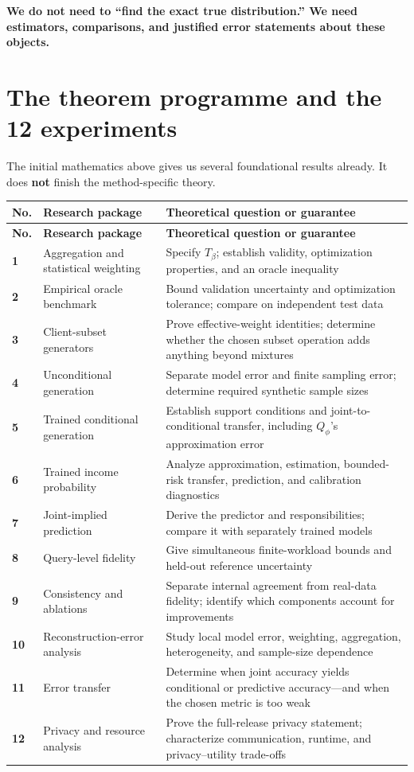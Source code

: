 \documentclass[11pt,a4paper]{article}
\begin{document}
\normalsize
\textbf{We do not need to ``find the exact true distribution.'' We need estimators, comparisons, and justified error statements about these objects.}

\section{The theorem programme and the 12 experiments}
The initial mathematics above gives us several foundational results already. It does \textbf{not} finish the method-specific theory.

\small
\begin{longtable}{@{}P{0.05\textwidth}P{0.29\textwidth}P{0.60\textwidth}@{}}
\toprule
\textbf{No.}&\textbf{Research package}&\textbf{Theoretical question or guarantee}\\\midrule
\endfirsthead
\toprule
\textbf{No.}&\textbf{Research package}&\textbf{Theoretical question or guarantee}\\\midrule
\endhead
\bottomrule\endfoot
\textbf{1}&Aggregation and statistical weighting&Specify $T_\beta$; establish validity, optimization properties, and an oracle inequality\\
\textbf{2}&Empirical oracle benchmark&Bound validation uncertainty and optimization tolerance; compare on independent test data\\
\textbf{3}&Client-subset generators&Prove effective-weight identities; determine whether the chosen subset operation adds anything beyond mixtures\\
\textbf{4}&Unconditional generation&Separate model error and finite sampling error; determine required synthetic sample sizes\\
\textbf{5}&Trained conditional generation&Establish support conditions and joint-to-conditional transfer, including $Q_\phi$'s approximation error\\
\textbf{6}&Trained income probability&Analyze approximation, estimation, bounded-risk transfer, prediction, and calibration diagnostics\\
\textbf{7}&Joint-implied prediction&Derive the predictor and responsibilities; compare it with separately trained models\\
\textbf{8}&Query-level fidelity&Give simultaneous finite-workload bounds and held-out reference uncertainty\\
\textbf{9}&Consistency and ablations&Separate internal agreement from real-data fidelity; identify which components account for improvements\\
\textbf{10}&Reconstruction-error analysis&Study local model error, weighting, aggregation, heterogeneity, and sample-size dependence\\
\textbf{11}&Error transfer&Determine when joint accuracy yields conditional or predictive accuracy---and when the chosen metric is too weak\\
\textbf{12}&Privacy and resource analysis&Prove the full-release privacy statement; characterize communication, runtime, and privacy--utility trade-offs\\
\end{longtable}
\end{document}

